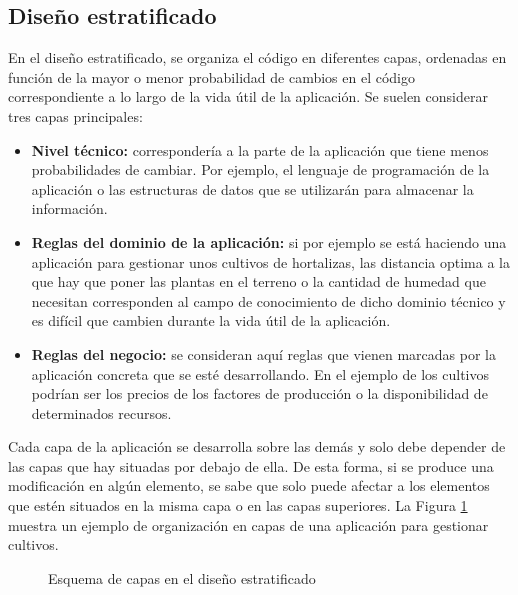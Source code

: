 \documentclass[a4paper,11pt]{extarticle}
\begin{document}
\subsection{Diseño estratificado}
En el diseño estratificado, se organiza el código en diferentes capas, ordenadas en función de la mayor o menor probabilidad de cambios en el código correspondiente a lo largo de la vida útil de la aplicación. Se suelen considerar tres capas principales:

\begin{itemize}
	\item \textbf{Nivel técnico:} correspondería a la parte de la aplicación que tiene menos probabilidades de cambiar. Por ejemplo, el lenguaje de programación de la aplicación o las estructuras de datos que se utilizarán para almacenar la información.
	\item \textbf{Reglas del dominio de la aplicación:} si por ejemplo se está haciendo una aplicación para gestionar unos cultivos de hortalizas, las distancia optima a la que hay que poner las plantas en el terreno o la cantidad de humedad que necesitan corresponden al campo de conocimiento de dicho dominio técnico y es difícil que cambien durante la vida útil de la aplicación.
	\item \textbf{Reglas del negocio:} se consideran aquí reglas que vienen marcadas por la aplicación concreta que se esté desarrollando. En el ejemplo de los cultivos podrían ser los precios de los factores de producción o la disponibilidad de determinados recursos.
\end{itemize}

Cada capa de la aplicación se desarrolla sobre las demás y solo debe depender de las capas que hay situadas por debajo de ella. De esta forma, si se produce una modificación en algún elemento, se sabe que solo puede afectar a los elementos que estén situados en la misma capa o en las capas superiores. La Figura \ref{fig_stratified} muestra un ejemplo de organización en capas de una aplicación para gestionar cultivos.

\vspace{1em}
\begin{figure}[htb]
	\centering {}
	\caption{Esquema de capas en el diseño estratificado}
	\label{fig_stratified}
\end{figure}
 
\end{document}
